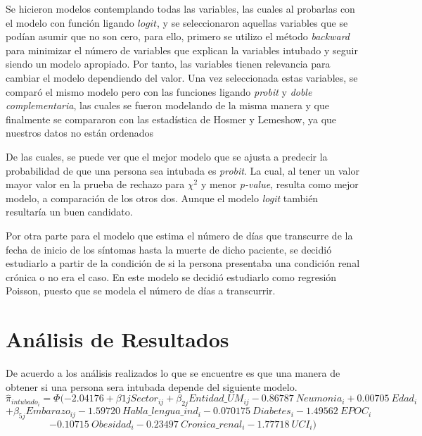 \documentclass[12pt,a4paper,oneside]{article}
\begin{document}
Se hicieron modelos contemplando todas las variables, las cuales al probarlas con el modelo con función ligando $logit$, y se seleccionaron aquellas variables que se podían asumir que no son cero, para ello, primero se utilizo el método \textit{backward} para minimizar el número de variables que explican la variables intubado y seguir siendo un modelo apropiado. Por tanto, las variables tienen relevancia para cambiar el modelo dependiendo del valor. Una vez seleccionada estas variables, se comparó el mismo modelo pero con las funciones ligando \textit{probit} y \textit{doble complementaria}, las cuales se fueron modelando de la misma manera y que finalmente se compararon con las estadística de Hosmer y Lemeshow, ya que nuestros datos no están ordenados

De las cuales, se puede ver que el mejor modelo que se ajusta a predecir la probabilidad de que una persona sea intubada es \textit{probit}. La cual, al tener un valor mayor valor en la prueba de rechazo para $\chi^2$ y menor \textit{p-value}, resulta como mejor modelo, a comparación de los otros dos. Aunque el modelo \textit{logit} también resultaría un buen candidato.

\begin{table}[H]
\end{table}

Por otra parte para el modelo que estima el número de días que transcurre de la fecha de inicio de los síntomas hasta la muerte de dicho paciente, se decidió estudiarlo a partir de la condición de si la persona presentaba una condición renal crónica o no era el caso.
En este modelo se decidió estudiarlo como regresión Poisson, puesto que se modela el número de días a transcurrir.

\section{Análisis de Resultados}
De acuerdo a los análisis realizados lo que se encuentre es que una manera de obtener si una persona sera intubada depende del siguiente modelo.
$$\widehat{\pi}_{intubado_i} = \Phi(- 2.04176 + \beta{1j} Sector_{ij} + \beta_{2j} Entidad\_UM_{ij} - 0.86787 \ Neumonia_i + 0.00705 \ Edad_i $$$$+ \beta_{5j} Embarazo_{ij} - 1.59720 \ Habla\_lengua\_ind_i - 0.070175 \ Diabetes_i - 1.49562 \ EPOC_i$$
$$ - 0.10715 \ Obesidad_i - 0.23497 \ Cronica\_renal_i - 1.77718 \ UCI_i)$$
 
\end{document}
